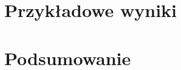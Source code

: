 \documentclass[12pt, twoside, a4paper, openright]{report}
\begin{document}
\chapter{Przykładowe wyniki}


\chapter{Podsumowanie} \label{ch:summary}


\begin{appendices}
\end{appendices}

\newpage

\listoffigures
\listoftables
\listoflistings

\nocite{*}


\end{document}
